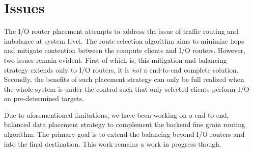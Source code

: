 \section{Issues}

The I/O router placement attempts to address the issue of traffic routing and
imbalance at system level. The route selection algorithm aims to minimize hops
and mitigate contention between the compute clients and I/O routers. However,
two issues remain evident. First of which is, this mitigation and balancing
strategy extends only to I/O routers, it is \emph{not} a end-to-end complete
solution. Secondly, the benefits of such placement strategy can only be
full realized when the whole system is under the control such that only
selected clients perform I/O on pre-determined targets. 

Due to aforementioned limitations, we have been working on a end-to-end,
balanced data placement strategy to complement the backend fine grain routing
algorithm. The primary goal is to extend the balancing beyond I/O routers and
into the final destination. This work remains a work in progress though.



